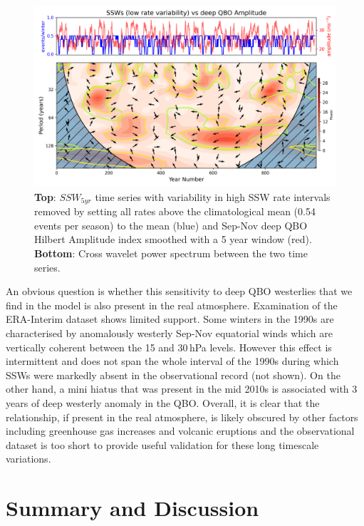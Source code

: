 \documentclass[wcd, manuscript]{copernicus}
\begin{document}
\begin{center}
\begin{figure}[h!]
\includegraphics[width = 0.8\linewidth]{new_changed_figures/cross_power_SSWs_low_rates_vs_QBO_amplitude_modulation_5yr_mean_new_levels.png}
\caption{\textbf{Top}: $SSW_{5yr}$ time series with variability in high SSW rate intervals removed by setting all rates above the climatological mean (0.54 events per season) to the mean (blue) and Sep-Nov deep QBO Hilbert Amplitude index smoothed with a 5 year window (red). \textbf{Bottom}: Cross wavelet power spectrum between the two time series.}
\label{fig1}
\end{figure}
\end{center}

An obvious question is whether this sensitivity to deep QBO westerlies that we find in the model is also present in the real atmosphere. Examination of the ERA-Interim dataset shows limited support. Some winters in the 1990s are characterised by anomalously westerly Sep-Nov equatorial winds which are vertically coherent between the 15 and 30\,hPa levels. However this effect is intermittent and does not span the whole interval of the 1990s during which SSWs were markedly absent in the observational record (not shown). On the other hand, a mini hiatus that was present in the mid 2010s is associated with 3 years of deep westerly anomaly in the QBO. Overall, it is clear that the relationship, if present in the real atmosphere, is likely obscured by other factors including greenhouse gas increases and volcanic eruptions and the observational dataset is too short to provide useful validation for these long timescale variations.  

 
\section{Summary and Discussion}
\end{document}
